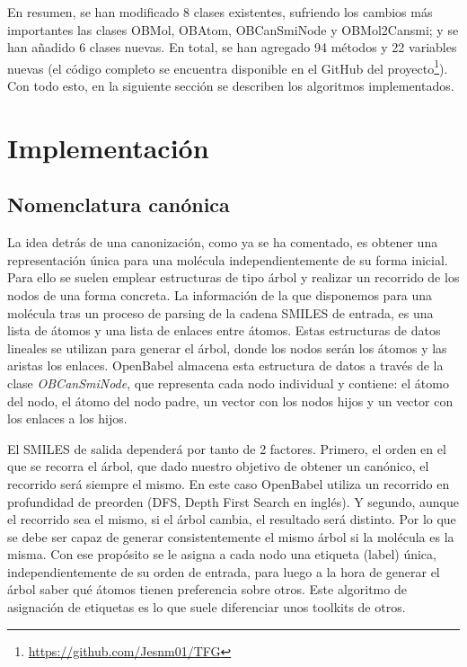 En resumen, se han modificado 8 clases existentes, sufriendo los cambios más importantes las clases OBMol, OBAtom, OBCanSmiNode y OBMol2Cansmi; y se han añadido 6 clases nuevas. En total, se han agregado 94 métodos y 22 variables nuevas (el código completo se encuentra disponible en el GitHub del proyecto\footnote{\url{https://github.com/Jesnm01/TFG}}). Con todo esto, en la siguiente sección se describen los algoritmos implementados.

\section{Implementación}

\subsection{Nomenclatura canónica} \label{canonizacion} \label{implementacion:canonizado}

La idea detrás de una canonización, como ya se ha comentado, es obtener una representación única para una molécula independientemente de su forma inicial. Para ello se suelen emplear estructuras de tipo árbol y realizar un recorrido de los nodos de una forma concreta. La información de la que disponemos para una molécula tras un proceso de parsing de la cadena SMILES de entrada, es una lista de átomos y una lista de enlaces entre átomos. Estas estructuras de datos lineales se utilizan para generar el árbol, donde los nodos serán los átomos y las aristas los enlaces. OpenBabel almacena esta estructura de datos a través de la clase \textit{OBCanSmiNode}, que representa cada nodo individual y contiene: el átomo del nodo, el átomo del nodo padre, un vector con los nodos hijos y un vector con los enlaces a los hijos.

El SMILES de salida dependerá por tanto de 2 factores. Primero, el orden en el que se recorra el árbol, que dado nuestro objetivo de obtener un canónico, el recorrido será siempre el mismo. En este caso OpenBabel utiliza un recorrido en profundidad de preorden (DFS, Depth First Search en inglés). Y segundo, aunque el recorrido sea el mismo, si el árbol cambia, el resultado será distinto. Por lo que se debe ser capaz de generar consistentemente el mismo árbol si la molécula es la misma. Con ese propósito se le asigna a cada nodo una etiqueta (label) única, independientemente de su orden de entrada, para luego a la hora de generar el árbol saber qué átomos tienen preferencia sobre otros. Este algoritmo de asignación de etiquetas es lo que suele diferenciar unos toolkits de otros.

